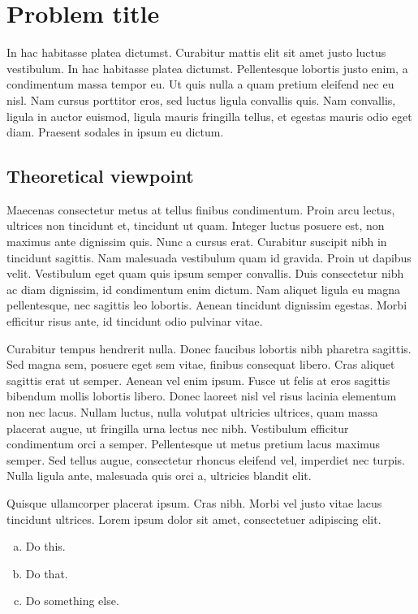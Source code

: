 \documentclass{article}
\begin{document}
\section{Problem title} %

In hac habitasse platea dictumst. Curabitur mattis elit sit amet justo luctus vestibulum. In hac habitasse platea dictumst. Pellentesque lobortis justo enim, a condimentum massa tempor eu. Ut quis nulla a quam pretium eleifend nec eu nisl. Nam cursus porttitor eros, sed luctus ligula convallis quis. Nam convallis, ligula in auctor euismod, ligula mauris fringilla tellus, et egestas mauris odio eget diam. Praesent sodales in ipsum eu dictum.


\subsection{Theoretical viewpoint}

Maecenas consectetur metus at tellus finibus condimentum. Proin arcu lectus, ultrices non tincidunt et, tincidunt ut quam. Integer luctus posuere est, non maximus ante dignissim quis. Nunc a cursus erat. Curabitur suscipit nibh in tincidunt sagittis. Nam malesuada vestibulum quam id gravida. Proin ut dapibus velit. Vestibulum eget quam quis ipsum semper convallis. Duis consectetur nibh ac diam dignissim, id condimentum enim dictum. Nam aliquet ligula eu magna pellentesque, nec sagittis leo lobortis. Aenean tincidunt dignissim egestas. Morbi efficitur risus ante, id tincidunt odio pulvinar vitae.

Curabitur tempus hendrerit nulla. Donec faucibus lobortis nibh pharetra sagittis. Sed magna sem, posuere eget sem vitae, finibus consequat libero. Cras aliquet sagittis erat ut semper. Aenean vel enim ipsum. Fusce ut felis at eros sagittis bibendum mollis lobortis libero. Donec laoreet nisl vel risus lacinia elementum non nec lacus. Nullam luctus, nulla volutpat ultricies ultrices, quam massa placerat augue, ut fringilla urna lectus nec nibh. Vestibulum efficitur condimentum orci a semper. Pellentesque ut metus pretium lacus maximus semper. Sed tellus augue, consectetur rhoncus eleifend vel, imperdiet nec turpis. Nulla ligula ante, malesuada quis orci a, ultricies blandit elit.

\begin{question}
	Quisque ullamcorper placerat ipsum. Cras nibh. Morbi vel justo vitae lacus tincidunt ultrices. Lorem ipsum dolor sit amet, consectetuer adipiscing elit.

	\begin{enumerate}[(a)]
		\item Do this.
		\item Do that.
		\item Do something else.
	\end{enumerate}
\end{question}
	
\end{document}

